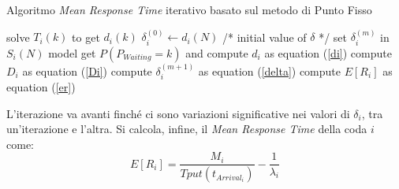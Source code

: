 \documentclass[12pt,a4paper,italian]{article}
\begin{document}
\begin{algorithm}
	\caption{Algoritmo \emph{Mean Response Time} iterativo basato sul metodo di Punto Fisso}
	\label{fixedpoint}
	\begin{algorithmic}[1]
				\State solve $T_i(k)$ to get $d_i(k)$
			\EndFor
			\State $\delta_i^{(0)} \gets d_i(N)$ /* initial value of $\delta$ */
		\EndFor
		\Repeat
				\State set $\delta_i^{(m)}$ in $S_i(N)$ model
					\State get $P(P_{Waiting} = k)$ and compute $d_i$ as equation (\ref{di})
				\EndFor
			\EndFor
				\State compute $D_i$ as equation (\ref{Di})
				\State compute $\delta_i^{(m+1)}$ as equation (\ref{delta})
			\EndFor
		\State compute $E[R_i]$ as equation (\ref{er})
	\end{algorithmic}
\end{algorithm}

L'iterazione va avanti finché ci sono variazioni significative nei valori di $\delta_i$, tra un'iterazione e l'altra. Si calcola, infine, il \emph{Mean Response Time} della coda $i$ come:
\begin{equation}
E[R_i] = \frac{M_i}{Tput(t_{Arrival_i})} - \frac{1}{\lambda_i}
\label{er}
\end{equation} 
\end{document}

